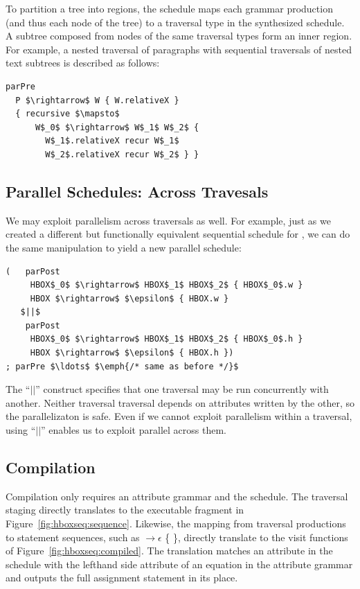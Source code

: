 To partition a tree into regions, the schedule maps each grammar production (and thus each node of the tree) to a traversal type in the synthesized schedule.  A subtree composed from nodes of the same traversal types form an inner region.  For example, a nested traversal of paragraphs with sequential traversals of nested text subtrees is described as follows: 

\begin{lstlisting}[mathescape,morekeywords={parPre,parPost,nested,recursive,recur}]
parPre 
  P $\rightarrow$ W { W.relativeX }
  { recursive $\mapsto$   
      W$_0$ $\rightarrow$ W$_1$ W$_2$ {
        W$_1$.relativeX recur W$_1$ 
        W$_2$.relativeX recur W$_2$ } }
\end{lstlisting}


\subsection{Parallel Schedules: Across Travesals}
We may exploit parallelism across traversals as well. For example, just as we created a different but functionally equivalent sequential schedule for \hlang, we can do the same manipulation to yield a new parallel schedule:

\begin{minipage}{1\columnwidth}
\begin{lstlisting}[mathescape,morekeywords={parPre,parPost}]
(   parPost
     HBOX$_0$ $\rightarrow$ HBOX$_1$ HBOX$_2$ { HBOX$_0$.w }
     HBOX $\rightarrow$ $\epsilon$ { HBOX.w }  
   $||$  
    parPost
     HBOX$_0$ $\rightarrow$ HBOX$_1$ HBOX$_2$ { HBOX$_0$.h }
     HBOX $\rightarrow$ $\epsilon$ { HBOX.h })
; parPre $\ldots$ $\emph{/* same as before */}$
\end{lstlisting}
\end{minipage}
The ``$||$'' construct specifies that one traversal may be run concurrently with another. Neither traversal traversal depends on attributes written by the other, so the parallelizaton is safe. Even if we cannot exploit parallelism within a traversal, using ``$||$'' enables us to exploit parallel across them. 









\subsection{Compilation}
Compilation only requires an attribute grammar and the schedule. The traversal staging  directly translates to the executable fragment in Figure~\ref{fig:hboxseq:sequence}. Likewise, the mapping from traversal productions to statement sequences, such as  $\rightarrow \epsilon$ \{  \}, directly translate to the visit functions of Figure~\ref{fig:hboxseq:compiled}. The translation matches an attribute in the schedule with the lefthand side attribute of an equation in the attribute grammar and outputs the full assignment statement in its place. 

